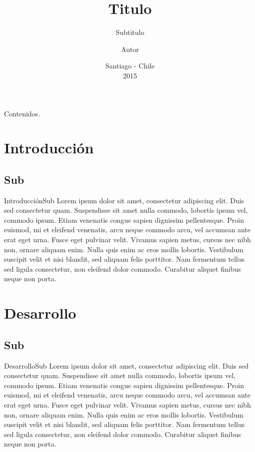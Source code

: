 \documentclass{beamer}
\title{Titulo}
\subtitle{Subtitulo}
\author[Autor]{Autor}
\institute[UdeSantiago]
{
  Departamento de Ingenier\'ia Inform\'atica\\
  Universidad de Santiago de Chile
 }
\date[Santiago, 2015]{\scriptsize{Santiago - Chile\\2015}}
\begin{document}
\begin{frame}
  \titlepage
\end{frame}

\begin{frame}[t]{Contenidos}{\textcolor{UniBlue}{.}}
	\tableofcontents
\end{frame}

\section{Introducción}

\subsection*{Sub}

\begin{frame}{Introducción}{Sub}
Lorem ipsum dolor sit amet, consectetur adipiscing elit. Duis sed consectetur quam. Suspendisse sit amet nulla commodo, lobortis ipsum vel, commodo ipsum. Etiam venenatis congue sapien dignissim pellentesque. Proin euismod, mi et eleifend venenatis, arcu neque commodo arcu, vel accumsan ante erat eget urna. Fusce eget pulvinar velit. Vivamus sapien metus, cursus nec nibh non, ornare aliquam enim. Nulla quis enim ac eros mollis lobortis. Vestibulum suscipit velit et nisi blandit, sed aliquam felis porttitor. Nam fermentum tellus sed ligula consectetur, non eleifend dolor commodo. Curabitur aliquet finibus neque non porta. 
\end{frame}

\section{Desarrollo}

\subsection*{Sub}
\begin{frame}{Desarrollo}{Sub}
Lorem ipsum dolor sit amet, consectetur adipiscing elit. Duis sed consectetur quam. Suspendisse sit amet nulla commodo, lobortis ipsum vel, commodo ipsum. Etiam venenatis congue sapien dignissim pellentesque. Proin euismod, mi et eleifend venenatis, arcu neque commodo arcu, vel accumsan ante erat eget urna. Fusce eget pulvinar velit. Vivamus sapien metus, cursus nec nibh non, ornare aliquam enim. Nulla quis enim ac eros mollis lobortis. Vestibulum suscipit velit et nisi blandit, sed aliquam felis porttitor. Nam fermentum tellus sed ligula consectetur, non eleifend dolor commodo. Curabitur aliquet finibus neque non porta. 
\end{frame}
\end{document}
